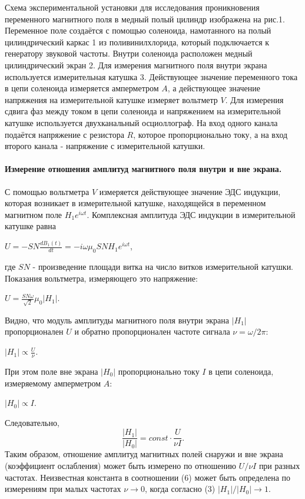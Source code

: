 \documentclass[a4paper,12pt]{article}
\begin{document}
Схема экспериментальной установки для исследования проникновения переменного магнитного поля в медный полый цилиндр изображена на рис.1. Переменное поле создаётся с помощью соленоида, намотанного на полый цилиндрический каркас 1 из поливинилхлорида, который подключается к генератору звуковой частоты. Внутри соленоида расположен медный цилиндрический экран 2. Для измерения магнитного поля внутри экрана используется измерительная катушка 3. Действующее значение переменного тока в цепи соленоида измеряется амперметром $A$, а действующее значение напряжения на измерительной катушке измеряет вольтметр $V$. Для измерения сдвига фаз между током в цепи соленоида и напряжением на измерительной катушке используется двухканальный осциоллограф. На вход одного канала подаётся напряжение с резистора $R$, которое пропорционально току, а на вход второго канала - напряжение с измерительной катушки.
\paragraph{Измерение отношения амплитуд магнитного поля внутри и вне экрана.\\}
С помощью вольтметра $V$ измеряется действующее значение ЭДС индукции, которая возникает в измерительной катушке, находящейся в переменном магнитном поле $H_1 e^{i\omega t}$. Комплексная амплитуда ЭДС индукции в измерительной катушке равна
\begin{center}
    $U=-SN\frac{dB_{1}(t)}{dt}=-i\omega \mu_0 SNH_1 e^{i\omega t}$,
\end{center}
где $SN$ - произведение площади витка на число витков измерительной катушки. Показания вольтметра, измеряющего это напряжение:
\begin{center}
    $U=\frac{SN\omega}{\sqrt{2}}\mu_0 |H_1|$.
\end{center}
Видно, что модуль амплитуды магнитного поля внутри экрана $|H_1|$ пропорционален $U$ и обратно пропорционален частоте сигнала $\nu = \omega / 2\pi$:
\begin{center}
    $|H_1|\propto \frac{U}{\nu}$.
\end{center}
При этом поле вне экрана $|H_0|$ пропорционально току $I$ в цепи соленоида, измеряемому амперметром $A$:
\begin{center}
    $|H_0|\propto I$.
\end{center}
Следовательно, 
\begin{equation}
    \frac{|H_1|}{|H_0|} = const\cdot \frac{U}{\nu I}.
\end{equation}
Таким образом, отношение амплитуд магнитных полей снаружи и вне экрана (коэффициент ослабления) может быть измерено по отношению $U / \nu I$ при разных частотах. Неизвестная константа в соотношении (6) может быть определена по измерениям при малых частотах $\nu \rightarrow 0$, когда согласно (3) $|H_1|/|H_0|\rightarrow 1$.
\end{document}
